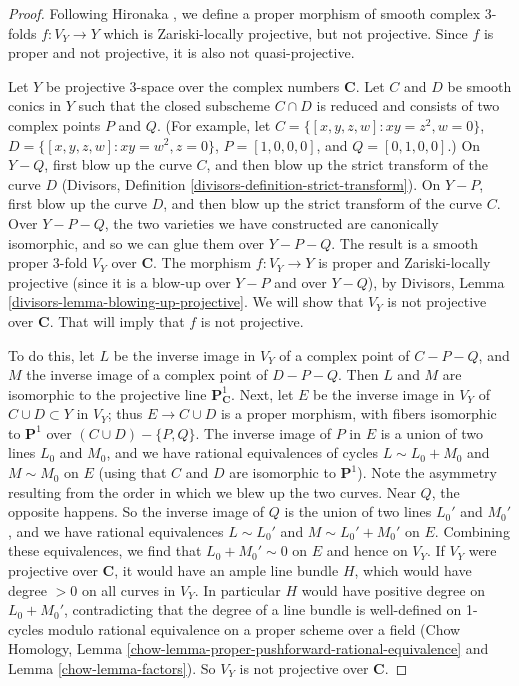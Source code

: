 \begin{proof}
Following Hironaka \cite[Example B.3.4.1]{H},
we define a proper morphism of smooth complex 3-folds
$f:V_Y\to Y$
which is Zariski-locally projective, but not projective. Since $f$ is proper
and not projective, it is also not quasi-projective.

\medskip\noindent
Let $Y$ be projective 3-space over the complex numbers ${\mathbf C}$.
Let $C$ and $D$ be smooth conics in $Y$ such
that the closed subscheme $C\cap D$ is reduced and consists
of two complex points $P$ and $Q$. (For example,
let $C=\{ [x,y,z,w]: xy=z^2, w=0\}$, $D=\{ [x,y,z,w]:
xy=w^2, z=0\}$, $P=[1,0,0,0]$,
and $Q=[0,1,0,0]$.) 
On $Y-Q$, first blow up the curve $C$, and then blow
up the strict transform of the curve $D$ (Divisors, Definition 
\ref{divisors-definition-strict-transform}). On $Y-P$, first blow up
the curve $D$, and then blow up the strict transform of the curve
$C$. Over $Y-P-Q$, the two varieties we have constructed are canonically
isomorphic, and so we can glue them over $Y-P-Q$. The result
is a smooth proper 3-fold $V_Y$ over ${\mathbf C}$. The morphism
$f:V_Y\to Y$ is proper and Zariski-locally projective (since
it is a blow-up over $Y-P$ and over $Y-Q$), by Divisors,
Lemma \ref{divisors-lemma-blowing-up-projective}. We will show that
$V_Y$ is not projective over ${\mathbf C}$. That will imply that
$f$ is not projective.

\medskip\noindent
To do this, let $L$ be the inverse image in $V_Y$ of a complex point
of $C-P-Q$, and $M$ the inverse image of a complex point of $D-P-Q$.
Then $L$ and $M$ are isomorphic to the projective line
${\mathbf P}^1_{{\mathbf C}}$. 
Next, let $E$ be the inverse image in $V_Y$ of $C\cup D\subset Y$ in $V_Y$;
thus $E\rightarrow C\cup D$ is a proper morphism, with fibers
isomorphic to ${\mathbf P}^1$ over $(C\cup D)-\{P,Q\}$.
The inverse
image of $P$ in $E$ is a union of two lines $L_0$ and $M_0$, and we have
rational equivalences of cycles $L\sim L_0+M_0$ and $M\sim M_0$ on $E$
(using that $C$ and $D$ are isomorphic to ${\mathbf P}^1$).
Note the asymmetry resulting from the order in which we blew
up the two curves. Near $Q$, the opposite happens. So the inverse image
of $Q$ is the union of two lines $L_0'$ and $M_0'$, and we have
rational equivalences $L\sim L_0'$ and $M\sim L_0'+M_0'$ on $E$.
Combining these equivalences, we find that $L_0+M_0'\sim 0$
on $E$ and hence on $V_Y$. If $V_Y$ were projective over ${\mathbf C}$,
it would have
an ample line bundle $H$, which would have degree $>0$ on all curves
in $V_Y$. In particular $H$ would have positive degree on $L_0+M_0'$,
contradicting that the degree of a line bundle is well-defined
on 1-cycles modulo rational equivalence on a proper scheme
over a field (Chow Homology,
Lemma \ref{chow-lemma-proper-pushforward-rational-equivalence}
and Lemma \ref{chow-lemma-factors}).
So $V_Y$ is not projective over ${\mathbf C}$.
\end{proof}

